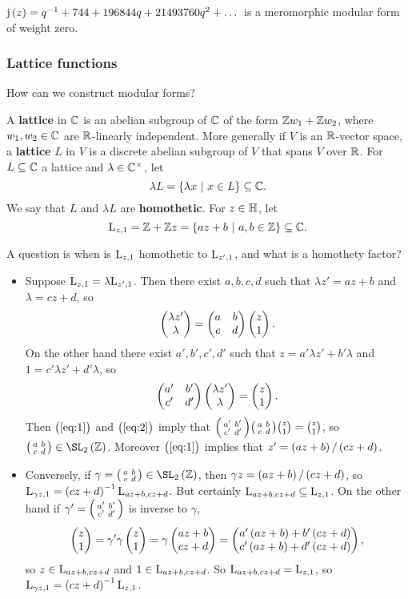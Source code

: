 \begin{example*}
$ \j\br{z} = q^{-1} + 744 + 196844q + 21493760q^2 + \dots $ is a meromorphic modular form of weight zero.
\end{example*}

\subsubsection{Lattice functions}

How can we construct modular forms?

\begin{definition}
A \textbf{lattice} in $ \mathbb{C} $ is an abelian subgroup of $ \mathbb{C} $ of the form $ \mathbb{Z} w_1 + \mathbb{Z} w_2 $, where $ w_1, w_2 \in \mathbb{C} $ are $ \mathbb{R} $-linearly independent. More generally if $ V $ is an $ \mathbb{R} $-vector space, a \textbf{lattice} $ L $ in $ V $ is a discrete abelian subgroup of $ V $ that spans $ V $ over $ \mathbb{R} $. For $ L \subseteq \mathbb{C} $ a lattice and $ \lambda \in \mathbb{C}^\times $, let
$$ \lambda L = \cbr{\lambda x \st x \in L} \subseteq \CC. $$
We say that $ L $ and $ \lambda L $ are \textbf{homothetic}. For $ z \in \mathbb{H} $, let
$$ \L_{z, 1} = \ZZ + \ZZ z = \cbr{az + b \st a, b \in \ZZ} \subseteq \CC. $$
\end{definition}

A question is when is $ \mathrm{L}_{z, 1} $ homothetic to $ \mathrm{L}_{z', 1} $, and what is a homothety factor?
\begin{itemize}
\item Suppose $ \mathrm{L}_{z, 1} = \lambda \mathrm{L}_{z', 1} $. Then there exist $ a, b, c, d $ such that $ \lambda z' = az + b $ and $ \lambda = cz + d $, so
\begin{equation}
\label{eq:1}
\begin{pmatrix} \lambda z' \\ \lambda \end{pmatrix} = \begin{pmatrix} a & b \\ c & d \end{pmatrix}\begin{pmatrix} z \\ 1 \end{pmatrix}.
\end{equation}
On the other hand there exist $ a', b', c', d' $ such that $ z = a'\lambda z' + b'\lambda $ and $ 1 = c'\lambda z' + d'\lambda $, so
\begin{equation}
\label{eq:2}
\begin{pmatrix} a' & b' \\ c' & d' \end{pmatrix}\begin{pmatrix} \lambda z' \\ \lambda \end{pmatrix} = \begin{pmatrix} z \\ 1 \end{pmatrix}.
\end{equation}
Then $ \br{\ref{eq:1}} $ and $ \br{\ref{eq:2}} $ imply that $ \begin{psmallmatrix} a' & b' \\ c' & d' \end{psmallmatrix}\begin{psmallmatrix} a & b \\ c & d \end{psmallmatrix}\binom{z}{1} = \binom{z}{1} $, so $ \twobytwosmall{a}{b}{c}{d} \in \SL_2\br{\ZZ} $. Moreover $ \br{\ref{eq:1}} $ implies that $ z' = \br{az + b} / \br{cz + d} $.
\item Conversely, if $ \gamma = \twobytwosmall{a}{b}{c}{d} \in \SL_2\br{\ZZ} $, then $ \gamma z = \br{az + b} / \br{cz + d} $, so $ \L_{\gamma z, 1} = \br{cz + d}^{-1}\L_{az + b, cz + d} $. But certainly $ \mathrm{L}_{az + b, cz + d} \subseteq \mathrm{L}_{z, 1} $. On the other hand if $ \gamma' = \begin{psmallmatrix} a' & b' \\ c' & d' \end{psmallmatrix} $ is inverse to $ \gamma $,
$$ \twobyone{z}{1} = \gamma'\gamma\twobyone{z}{1} = \gamma\twobyone{az + b}{cz + d} = \twobyone{a'\br{az + b} + b'\br{cz + d}}{c'\br{az + b} + d'\br{cz + d}}, $$
so $ z \in \mathrm{L}_{az + b, cz + d} $ and $ 1 \in \mathrm{L}_{az + b, cz + d} $. So $ \mathrm{L}_{az + b, cz + d} = \mathrm{L}_{z, 1} $, so $ \L_{\gamma z, 1} = \br{cz + d}^{-1}\L_{z, 1} $.
\end{itemize}

